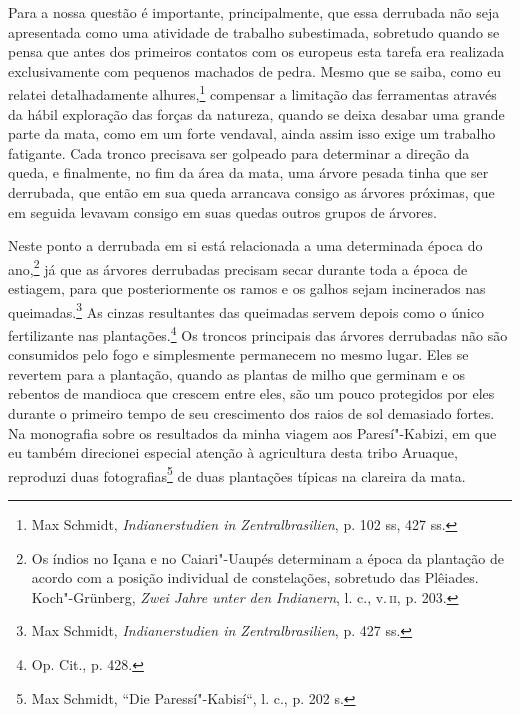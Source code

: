 Para a nossa questão é importante, principalmente, que essa derrubada
não seja apresentada como uma atividade de trabalho subestimada,
sobretudo quando se pensa que antes dos primeiros contatos com os
europeus esta tarefa era realizada exclusivamente com pequenos machados
de pedra. Mesmo que se saiba, como eu relatei detalhadamente
alhures,\footnote{Max Schmidt, \emph{Indianerstudien in
  Zentralbrasilien}, p. 102 ss, 427 ss.} compensar a limitação das
ferramentas através da hábil exploração das forças da natureza, quando
se deixa desabar uma grande parte da mata, como em um forte vendaval,
ainda assim isso exige um trabalho fatigante. Cada tronco precisava ser
golpeado para determinar a direção da queda, e finalmente, no fim da
área da mata, uma árvore pesada tinha que ser derrubada, que então em
sua queda arrancava consigo as árvores próximas, que em seguida levavam
consigo em suas quedas outros grupos de árvores.

Neste ponto a derrubada em si está relacionada a uma determinada época
do ano,\footnote{Os índios no Içana e no Caiari"-Uaupés determinam a época
  da plantação de acordo com a posição individual de constelações,
  sobretudo das Plêiades. Koch"-Grünberg, \emph{Zwei Jahre unter den
  Indianern}, l. c., v.\,\textsc{ii}, p. 203.} já que as árvores derrubadas
precisam secar durante toda a época de estiagem, para que
posteriormente os ramos e os galhos sejam incinerados nas
queimadas.\footnote{Max Schmidt, \emph{Indianerstudien in
  Zentralbrasilien}, p. 427 ss.} As cinzas resultantes das queimadas
servem depois como o único fertilizante nas plantações.\footnote{Op.
  Cit., p. 428.} Os troncos principais das árvores derrubadas não são
consumidos pelo fogo e simplesmente permanecem no mesmo lugar. Eles se
revertem para a plantação, quando as plantas de milho que germinam e os
rebentos de mandioca que crescem entre eles, são um pouco protegidos
por eles durante o primeiro tempo de seu crescimento dos raios de sol
demasiado fortes. Na monografia sobre os resultados da minha viagem aos
Paresí"-Kabizi, em que eu também direcionei especial atenção à
agricultura desta tribo Aruaque, reproduzi duas fotografias\footnote{Max
  Schmidt, ``Die Paressí"-Kabisí``, l. c., p. 202 s.} de duas plantações
típicas na clareira da mata.

